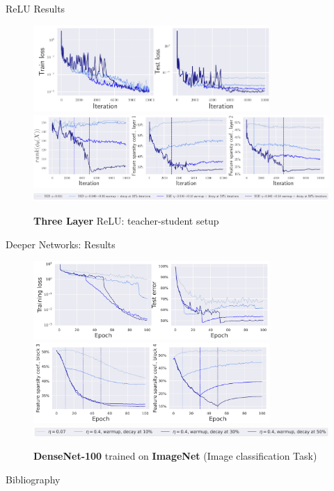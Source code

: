 \documentclass[fleqn]{beamer}
\begin{document}
    \begin{frame}{ReLU Results}
        \begin{figure}[htpb]
            \centering
            \includegraphics[width=0.8\textwidth,
            height=0.4\textheight]{./pics/relu3_loss.png}
            \includegraphics[width=\textwidth,
            height=0.4\textheight]{./pics/relu3_sparsity.png}
            \includegraphics[width=\textwidth]{./pics/relu3_setup.png}
            \caption{\textbf{Three Layer} ReLU: teacher-student setup}
        \end{figure}
    \end{frame}

   \begin{frame}{Deeper Networks: Results}
        \begin{figure}[htpb]
            \centering
            \includegraphics[width=0.8\textwidth,
            height=0.4\textheight]{./pics/densen_tiny_loss.png}
            \includegraphics[width=0.8\textwidth,
            height=0.4\textheight]{./pics/densen_tiny_sparsity.png}
            \includegraphics[width=\textwidth]{./pics/densen_tiny_setup.png}
            \caption{\textbf{DenseNet-100} trained on \textbf{ImageNet}
            (Image classification Task)}
        \end{figure}
   \end{frame}

\begin{frame}{Bibliography}
        \nocite{andriushchenko2023sgd}
        \nocite{shalev2014understanding}
        \nocite{li2018stochastic}
        \nocite{pillaudvivien2022label}
        \printbibliography
    \end{frame}
\end{document}
